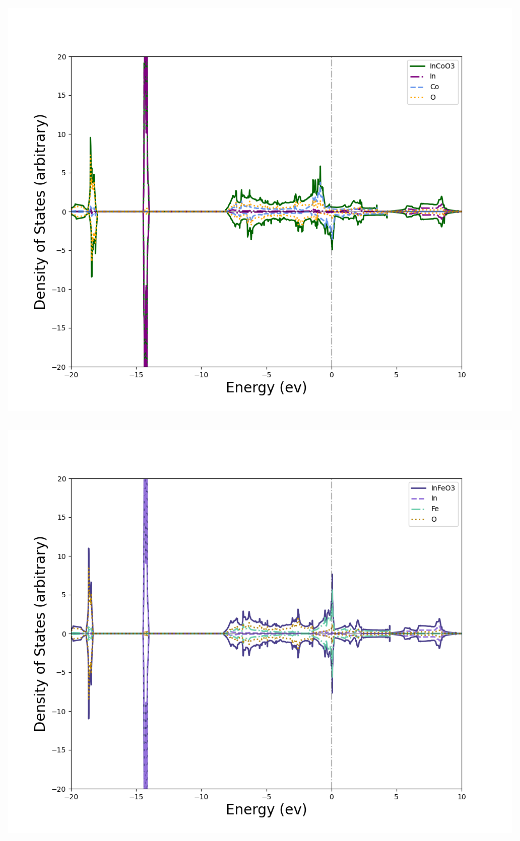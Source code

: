 \documentclass[12pt, letterpaper]{article}
\newcommand*{\1}{\hspace{1pt}}
\begin{document}
    \begin{adjustbox}{center,caption={Density of States Of InCoO3},label={somelabel},nofloat=figure,vspace=\bigskipamount,}
        \includegraphics[width=\textwidth]{DosInCoO3}
    \end{adjustbox}

    \begin{adjustbox}{center,caption={Density of States Of InFeO3},label={somelabel},nofloat=figure,vspace=\bigskipamount,}
        \includegraphics[width=\textwidth]{DosInFeO3}
    \end{adjustbox}
    
\end{document}
